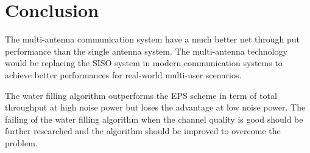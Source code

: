 \documentclass{article}
\begin{document}
\section{Conclusion}
The multi-antenna communication system have a much better net through put performance than the single antenna system.
The multi-antenna technology would be replacing the SISO system in modern communication systems to achieve better performances for
real-world multi-user scenarios.

\noindent
The water filling algorithm outperforms the EPS scheme in term of total throughput at high noise power but loses the advantage at low noise power.
The failing of the water filling algorithm when the channel quality is good should be further researched and the algorithm should be
improved to overcome the problem.
\end{document}
